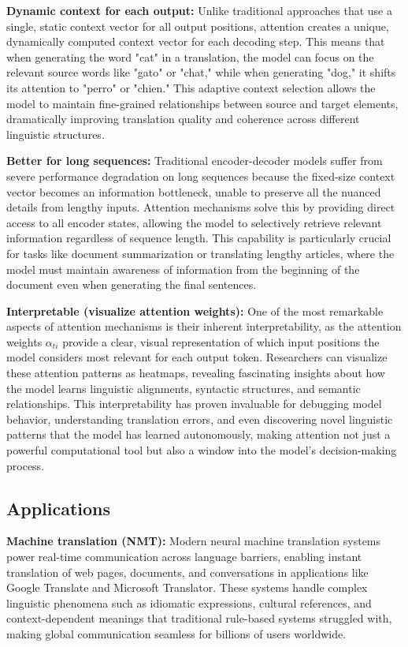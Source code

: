
\textbf{Dynamic context for each output:} Unlike traditional approaches that use a single, static context vector for all output positions, attention creates a unique, dynamically computed context vector for each decoding step. This means that when generating the word "cat" in a translation, the model can focus on the relevant source words like "gato" or "chat," while when generating "dog," it shifts its attention to "perro" or "chien." This adaptive context selection allows the model to maintain fine-grained relationships between source and target elements, dramatically improving translation quality and coherence across different linguistic structures.

\textbf{Better for long sequences:} Traditional encoder-decoder models suffer from severe performance degradation on long sequences because the fixed-size context vector becomes an information bottleneck, unable to preserve all the nuanced details from lengthy inputs. Attention mechanisms solve this by providing direct access to all encoder states, allowing the model to selectively retrieve relevant information regardless of sequence length. This capability is particularly crucial for tasks like document summarization or translating lengthy articles, where the model must maintain awareness of information from the beginning of the document even when generating the final sentences.

\textbf{Interpretable (visualize attention weights):} One of the most remarkable aspects of attention mechanisms is their inherent interpretability, as the attention weights $\alpha_{ti}$ provide a clear, visual representation of which input positions the model considers most relevant for each output token. Researchers can visualize these attention patterns as heatmaps, revealing fascinating insights about how the model learns linguistic alignments, syntactic structures, and semantic relationships. This interpretability has proven invaluable for debugging model behavior, understanding translation errors, and even discovering novel linguistic patterns that the model has learned autonomously, making attention not just a powerful computational tool but also a window into the model's decision-making process.

\subsection{Applications}

\textbf{Machine translation (NMT):} Modern neural machine translation systems power real-time communication across language barriers, enabling instant translation of web pages, documents, and conversations in applications like Google Translate and Microsoft Translator. These systems handle complex linguistic phenomena such as idiomatic expressions, cultural references, and context-dependent meanings that traditional rule-based systems struggled with, making global communication seamless for billions of users worldwide.

